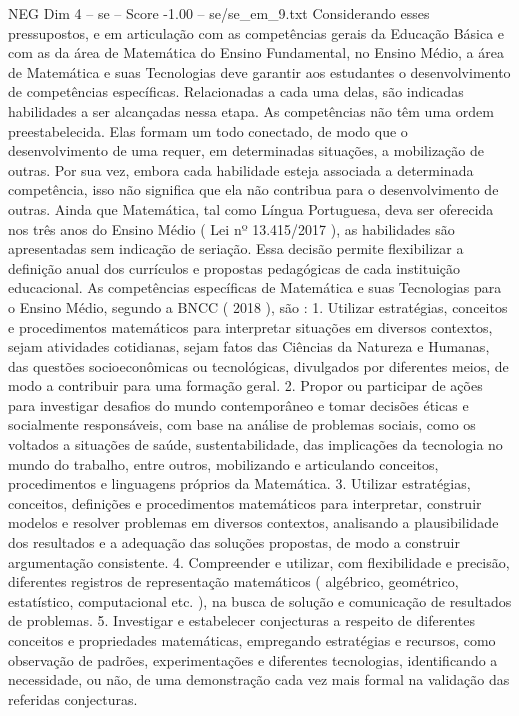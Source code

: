 \begin{textsample}{NEG Dim 4 – se – Score -1.00 – se/se\_em\_9.txt}
Considerando esses pressupostos, e em articulação com as competências gerais da Educação Básica e com as da área de Matemática do Ensino Fundamental, no Ensino Médio, a área de Matemática e suas Tecnologias deve garantir aos estudantes o desenvolvimento de competências específicas.
Relacionadas a cada uma delas, são indicadas habilidades a ser alcançadas nessa etapa.
As competências não têm uma ordem preestabelecida.
Elas formam um todo conectado, de modo que o desenvolvimento de uma requer, em determinadas situações, a mobilização de outras.
Por sua vez, embora cada habilidade esteja associada a determinada competência, isso não significa que ela não contribua para o desenvolvimento de outras.
Ainda que Matemática, tal como Língua Portuguesa, deva ser oferecida nos três anos do Ensino Médio ( Lei nº 13.415/2017 ), as habilidades são apresentadas sem indicação de seriação.
Essa decisão permite flexibilizar a definição anual dos currículos e propostas pedagógicas de cada instituição educacional.
As competências específicas de Matemática e suas Tecnologias para o Ensino Médio, segundo a BNCC ( 2018 ), são : 1.
Utilizar estratégias, conceitos e procedimentos matemáticos para interpretar situações em diversos contextos, sejam atividades cotidianas, sejam fatos das Ciências da Natureza e Humanas, das questões socioeconômicas ou tecnológicas, divulgados por diferentes meios, de modo a contribuir para uma formação geral. 2.
Propor ou participar de ações para investigar desafios do mundo contemporâneo e tomar decisões éticas e socialmente responsáveis, com base na análise de problemas sociais, como os voltados a situações de saúde, sustentabilidade, das implicações da tecnologia no mundo do trabalho, entre outros, mobilizando e articulando conceitos, procedimentos e linguagens próprios da Matemática. 3.
Utilizar estratégias, conceitos, definições e procedimentos matemáticos para interpretar, construir modelos e resolver problemas em diversos contextos, analisando a plausibilidade dos resultados e a adequação das soluções propostas, de modo a construir argumentação consistente. 4.
Compreender e utilizar, com flexibilidade e precisão, diferentes registros de representação matemáticos ( algébrico, geométrico, estatístico, computacional etc. ), na busca de solução e comunicação de resultados de problemas. 5.
Investigar e estabelecer conjecturas a respeito de diferentes conceitos e propriedades matemáticas, empregando estratégias e recursos, como observação de padrões, experimentações e diferentes tecnologias, identificando a necessidade, ou não, de uma demonstração cada vez mais formal na validação das referidas conjecturas.

\end{textsample}
